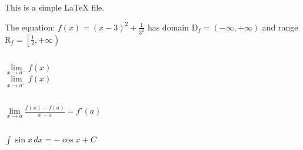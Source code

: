 \documentclass[11 pt]{report}
\begin{document}
\chapter{}

 \section{}
 This is a simple \LaTeX{} file.
 
 The equation: $ f(x)=(x-3)^2+\frac{1}{3^2} $ has domain $ \mathrm{D}_f=(-\infty, +\infty) $ and range $ \mathrm{R}_f=\left [\frac{1}{2}, +\infty \right) $
 
 \section{}
 $ \lim \limits_{x \to a^-}f(x) $\\
 $ \lim \limits_{x \to a^+}f(x) $
 
 \section{}
 $ \displaystyle{ \lim \limits_{x \to a}\frac{f(x)-f(a)}{x-a}=f'(a) } $
 
 \section{}
 $ \displaystyle{ \int\sin x \, dx=-\cos x+C } $
 
 \section{}
 
\end{document}
